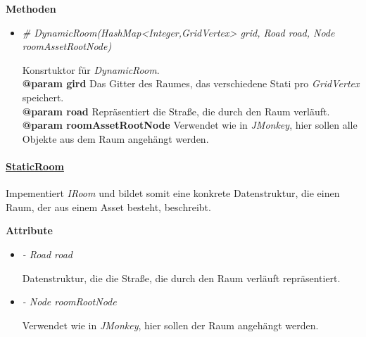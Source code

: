             \textbf{Methoden}					
            \begin{itemize}
                \item  \textit{\# DynamicRoom(HashMap<Integer,GridVertex> grid, Road road, Node roomAssetRootNode)}
                    \begin{leftbar}[0.9\linewidth]
                        Konsrtuktor für \textit{DynamicRoom}.\\
                        \textbf{@param gird} Das Gitter des Raumes, das verschiedene Stati pro \textit{GridVertex} speichert.\\
                        \textbf{@param road} Repräsentiert die Straße, die durch den Raum verläuft.\\
                        \textbf{@param roomAssetRootNode} Verwendet wie in \textit{JMonkey}, hier sollen alle Objekte aus dem Raum angehängt werden.
                    \end{leftbar}   
            \end{itemize}
        
        
        \pagebreak
        \paragraph{\underline{StaticRoom}} \mbox{}\par
         Impementiert \textit{IRoom} und bildet somit eine konkrete Datenstruktur, die einen Raum, der aus einem Asset besteht, beschreibt.\par
            
            \textbf{Attribute}
            \begin{itemize}
                \item  \textit{- Road road} 
                    \begin{leftbar}[0.9\linewidth]
                        Datenstruktur, die die Straße, die durch den Raum verläuft repräsentiert.
                    \end{leftbar}
                
                \item  \textit{- Node roomRootNode} 
                    \begin{leftbar}[0.9\linewidth]
                        Verwendet wie in \textit{JMonkey}, hier sollen der Raum angehängt werden.
                    \end{leftbar}
            \end{itemize}


